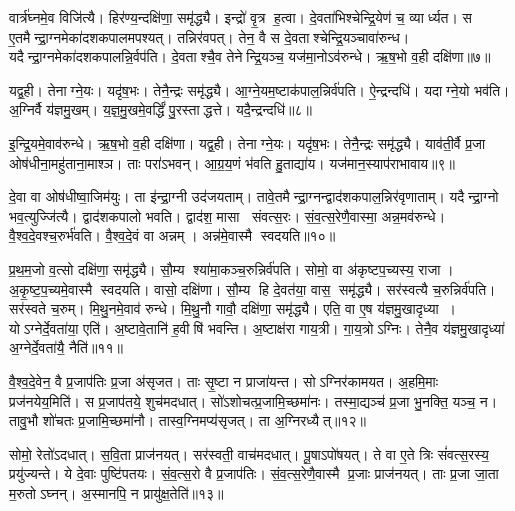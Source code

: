 वार्त्र॑घ्नमे॒व विजि॑त्यै। हिर॑ण्य॒न्दक्षि॑णा॒ समृ॑द्ध्यै। इन्द्रो॑ वृ॒त्र ह॒त्वा। दे॒वता॑भिश्चेन्द्रि॒येण॑ च॒ व्यार्ध्यत। स ए॒तमैन्द्रा॒ग्नमेका॑दशकपालमपश्यत्। तन्निर॑वपत्। तेन॒ वै स दे॒वताश्चेन्द्रि॒यञ्चावा॑रुन्ध। यदैन्द्रा॒ग्नमेका॑दशकपालन्नि॒र्वप॑ति। दे॒वताश्चै॒व तेनेन्द्रि॒यञ्च॒ यज॑मा॒नोऽव॑रुन्धे। ऋ॒ष॒भो व॒ही दक्षि॑णा॥७॥

यद्व॒ही। तेनाग्ने॒यः। यदृ॑ष॒भः। तेनै॒न्द्रः समृ॑द्ध्यै। आ॒ग्ने॒यम॒ष्टाक॑पाल॒न्निर्व॑पति। ऐ॒न्द्रन्दधि॑। यदाग्ने॒यो भव॑ति। अ॒ग्निर्वै य॑ज्ञमु॒खम्। य॒ज्ञ॒मु॒खमे॒वर्द्धिं॑ पु॒रस्ताद्धत्ते। यदै॒न्द्रन्दधि॑॥८॥

इ॒न्द्रि॒यमे॒वाव॑रुन्धे। ऋ॒ष॒भो व॒ही दक्षि॑णा। यद्व॒ही। तेनाग्ने॒यः। यदृ॑ष॒भः। तेनै॒न्द्रः समृ॑द्ध्यै। याव॑ती॒र्वै प्र॒जा ओष॑धीना॒महु॑ताना॒माश्ञ\sn{}। ताः परा॑ऽभवन्। आ॒ग्र॒य॒णं भ॑वति हु॒ताद्या॑य। यज॑मान॒स्याप॑राभावाय॥९॥

दे॒वा वा ओष॑धीष्वा॒जिम॑युः। ता इ॑न्द्रा॒ग्नी उद॑जयताम्। तावे॒तमैन्द्रा॒ग्नन्द्वाद॑शकपाल॒न्निर॑वृणाताम्। यदैन्द्रा॒ग्नो भव॒त्युज्जि॑त्यै। द्वाद॑शकपालो भवति। द्वाद॑श॒ मासा संवत्स॒रः। सं॒व॒त्स॒रेणै॒वास्मा॒ अन्न॒मव॑रुन्धे। वै॒श्व॒दे॒वश्च॒रुर्भ॑वति। वै॒श्व॒दे॒वं वा अन्नम्। अन्न॑मे॒वास्मै स्वदयति॥१०॥

प्र॒थ॒म॒जो व॒त्सो दक्षि॑णा॒ समृ॑द्ध्यै। सौ॒म्य श्या॑मा॒कञ्च॒रुन्निर्व॑पति। सोमो॒ वा अ॑कृष्टप॒च्यस्य॒ राजा। अ॒कृ॒ष्ट॒प॒च्यमे॒वास्मै स्वदयति। वासो॒ दक्षि॑णा। सौ॒म्य हि दे॒वत॑या॒ वास॒ समृ॑द्ध्यै। सर॑स्वत्यै च॒रुन्निर्व॑पति। सर॑स्वते च॒रुम्। मि॒थु॒नमे॒वाव॑ रुन्धे। मि॒थु॒नौ गावौ॒ दक्षि॑णा॒ समृ॑द्ध्यै। एति॒ वा ए॒ष य॑ज्ञमु॒खादृध्या। योऽग्नेर्दे॒वता॑या॒ एति॑। अ॒ष्टावे॒तानि॑ ह॒वीषि॑ भवन्ति। अ॒ष्टाक्ष॑रा गाय॒त्री। गा॒य॒त्रोऽग्निः। तेनै॒व य॑ज्ञमु॒खादृध्या॑ अ॒ग्नेर्दे॒वता॑यै॒ नैति॑॥११॥

वै॒श्व॒दे॒वेन॒ वै प्र॒जाप॑तिः प्र॒जा अ॑सृजत। ताः सृ॒ष्टा न प्राजा॑यन्त। सोऽग्निर॑कामयत। अ॒हमि॒माः प्रज॑नयेय॒मिति॑। स प्र॒जाप॑तये॒ शुच॑मदधात्। सो॑ऽशोचत्प्र॒जामि॒च्छमा॑नः। तस्मा॒द्यञ्च॑ प्र॒जा भु॒नक्ति॒ यञ्च॒ न। तावु॒भौ शो॑चतः प्र॒जामि॒च्छमा॑नौ। तास्व॒ग्निमप्य॑सृजत्। ता अ॒ग्निरध्यैत्॥१२॥

सोमो॒ रेतो॑ऽदधात्। स॒वि॒ता प्राज॑नयत्। सर॑स्वती॒ वाच॑मदधात्। पू॒षाऽपो॑षयत्। ते वा ए॒ते त्रिः सं॑वत्स॒रस्य॒ प्रयु॑ज्यन्ते। ये दे॒वाः पुष्टि॑पतयः। सं॒व॒त्स॒रो वै प्र॒जाप॑तिः। सं॒व॒त्स॒रेणै॒वास्मै प्र॒जाः प्राज॑नयत्। ताः प्र॒जा जा॒ता म॒रुतोऽघ्नन्। अ॒स्मानपि॒ न प्रायु॑क्ष॒तेति॑॥१३॥

